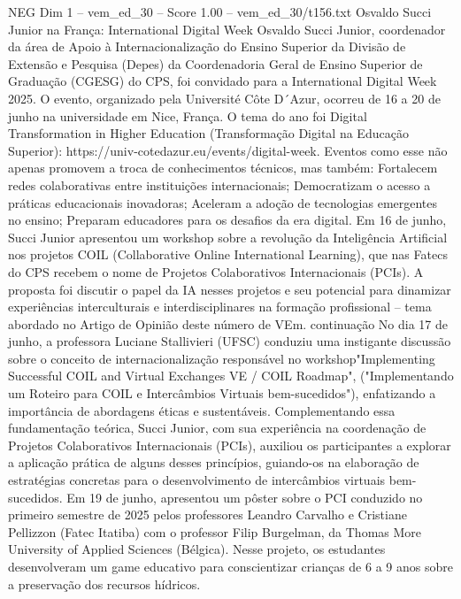 \begin{textsample}{NEG Dim 1 – vem\_ed\_30 – Score 1.00 – vem\_ed\_30/t156.txt}  \label{ex:f1_neg_029}
Osvaldo Succi Junior na França: International Digital Week Osvaldo Succi Junior, coordenador da área de Apoio à Internacionalização do Ensino Superior da Divisão de Extensão e Pesquisa (Depes) da Coordenadoria Geral de Ensino Superior de Graduação (CGESG) do CPS, foi convidado para a International Digital Week 2025.
O evento, organizado pela Université Côte D´Azur, ocorreu de 16 a 20 de junho na universidade em Nice, França.
O tema do ano foi Digital Transformation in Higher Education (Transformação Digital na Educação Superior): https://univ-cotedazur.eu/events/digital-week.
Eventos como esse não apenas promovem a troca de conhecimentos técnicos, mas também: Fortalecem redes colaborativas entre instituições internacionais; Democratizam o acesso a práticas educacionais inovadoras; Aceleram a adoção de tecnologias emergentes no ensino; Preparam educadores para os desafios da era digital.
Em 16 de junho, Succi Junior apresentou um workshop sobre a revolução da Inteligência Artificial nos projetos COIL (Collaborative Online International Learning), que nas Fatecs do CPS recebem o nome de Projetos Colaborativos Internacionais (PCIs).
A proposta foi discutir o papel da IA nesses projetos e seu potencial para dinamizar experiências interculturais e interdisciplinares na formação profissional – tema abordado no Artigo de Opinião deste número de VEm. continuação No dia 17 de junho, a professora Luciane Stallivieri (UFSC) conduziu uma instigante discussão sobre o conceito de internacionalização responsável no workshop"Implementing Successful COIL and Virtual Exchanges VE / COIL Roadmap", ("Implementando um Roteiro para COIL e Intercâmbios Virtuais bem-sucedidos"), enfatizando a importância de abordagens éticas e sustentáveis.
Complementando essa fundamentação teórica, Succi Junior, com sua experiência na coordenação de Projetos Colaborativos Internacionais (PCIs), auxiliou os participantes a explorar a aplicação prática de alguns desses princípios, guiando-os na elaboração de estratégias concretas para o desenvolvimento de intercâmbios virtuais bem-sucedidos.
Em 19 de junho, apresentou um pôster sobre o PCI conduzido no primeiro semestre de 2025 pelos professores Leandro Carvalho e Cristiane Pellizzon (Fatec Itatiba) com o professor Filip Burgelman, da Thomas More University of Applied Sciences (Bélgica).
Nesse projeto, os estudantes desenvolveram um game educativo para conscientizar crianças de 6 a 9 anos sobre a preservação dos recursos hídricos.

\end{textsample}
